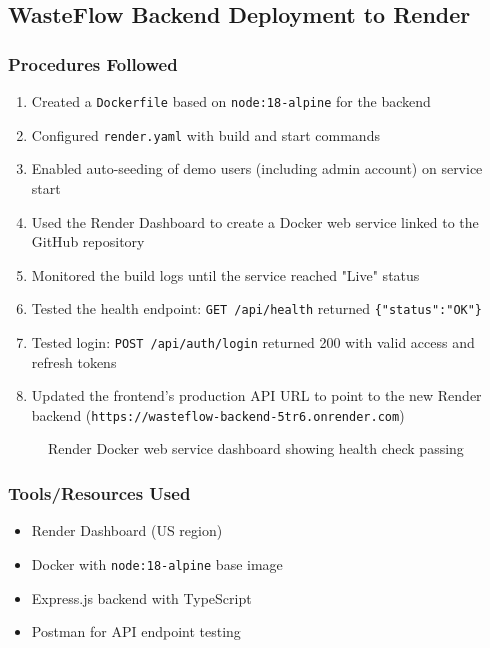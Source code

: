 \documentclass[12pt,a4paper]{article}
\begin{document}
\subsection{WasteFlow Backend Deployment to Render}
\label{subsec:wasteflow_backend}

\subsubsection*{Procedures Followed}
\begin{enumerate}
    \item Created a \texttt{Dockerfile} based on \texttt{node:18-alpine} for the backend
    \item Configured \texttt{render.yaml} with build and start commands
    \item Enabled auto-seeding of demo users (including admin account) on service start
    \item Used the Render Dashboard to create a Docker web service linked to the GitHub repository
    \item Monitored the build logs until the service reached "Live" status
    \item Tested the health endpoint: \texttt{GET /api/health} returned \texttt{\{"status":"OK"\}}
    \item Tested login: \texttt{POST /api/auth/login} returned 200 with valid access and refresh tokens
    \item Updated the frontend's production API URL to point to the new Render backend (\texttt{https://wasteflow-backend-5tr6.onrender.com})
\end{enumerate}

\begin{figure}[H]
    \centering
    \caption{Render Docker web service dashboard showing health check passing}
    \label{fig:render_dashboard}
\end{figure}

\subsubsection*{Tools/Resources Used}
\begin{itemize}
    \item Render Dashboard (US region)
    \item Docker with \texttt{node:18-alpine} base image
    \item Express.js backend with TypeScript
    \item Postman for API endpoint testing
\end{itemize}
\end{document}
